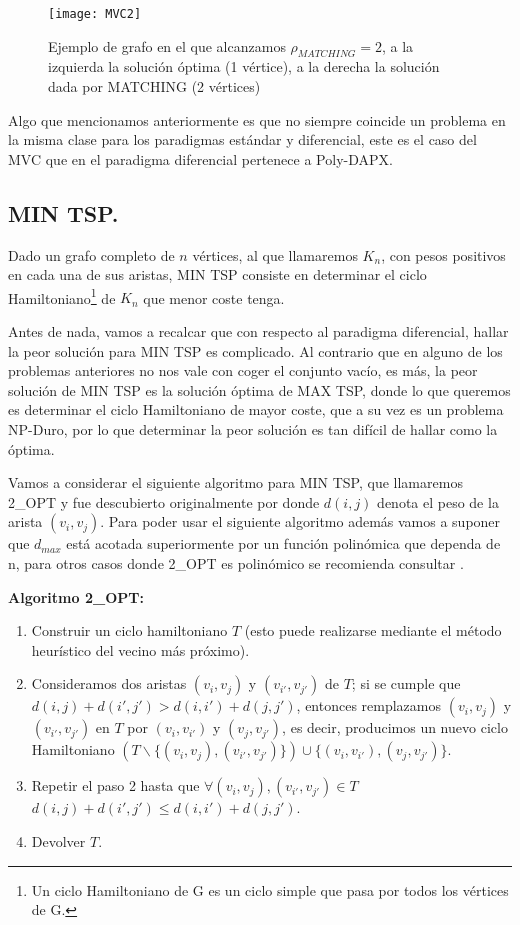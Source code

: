 \documentclass[a4paper,12pt,titlepage]{article}
\begin{document}
\begin{figure}[h]
\centering
\texttt{[image: MVC2]}
\caption{Ejemplo de grafo en el que alcanzamos $\rho_{MATCHING} = 2$, a la izquierda la soluci\'on \'optima (1 v\'ertice), a la derecha la soluci\'on dada por MATCHING (2 v\'ertices)}
\end{figure}

Algo que mencionamos anteriormente es que no siempre coincide un problema en la misma clase para los paradigmas est\'andar y diferencial, este es el caso del MVC que en el paradigma diferencial pertenece a Poly-DAPX\cite{mvc1}.

\subsection{MIN TSP.}
\label{sec:TSP}

Dado un grafo completo de $n$ v\'ertices, al que llamaremos $K_n$, con pesos positivos en cada una de sus aristas, MIN TSP consiste en determinar el ciclo Hamiltoniano\footnote{Un ciclo Hamiltoniano de G es un ciclo simple que pasa por todos los v\'ertices de G.} de $K_n$ que menor coste tenga.

Antes de nada, vamos a recalcar que con respecto al paradigma diferencial, hallar la peor soluci\'on para MIN TSP es complicado. Al contrario que en alguno de los problemas anteriores no nos vale con coger el conjunto vac\'io, es m\'as, la peor soluci\'on de MIN TSP es la soluci\'on \'optima de MAX TSP, donde lo que queremos es determinar el ciclo Hamiltoniano de mayor coste, que a su vez es un problema NP-Duro, por lo que determinar la peor soluci\'on es tan dif\'icil de hallar como la \'optima.

Vamos a considerar el siguiente algoritmo para MIN TSP, que llamaremos 2\_{OPT} y fue descubierto originalmente por \cite{TSP1} donde $d(i,j)$ denota el peso de la arista $(v_i,v_j)$.
Para poder usar el siguiente algoritmo adem\'as vamos a suponer que $d_{max}$ est\'a acotada superiormente por un funci\'on polin\'omica que dependa de n, para otros casos donde 2\_{OPT} es polin\'omico se recomienda consultar \cite{TSP2}.

\vspace{0.3cm}

\textbf{Algoritmo 2\_OPT:}

\begin{enumerate}
\item Construir un ciclo hamiltoniano $T$ (esto puede realizarse mediante el m\'etodo heur\'istico del vecino m\'as pr\'oximo).
\item Consideramos dos aristas $(v_i,v_j)$ y $(v_{i'},v_{j'})$ de $T$; si se cumple que $d(i,j)+d(i',j') > d(i,i')+d(j,j')$, entonces remplazamos $(v_i,v_j)$ y $(v_{i'},v_{j'})$ en $T$ por $(v_i,v_{i'})$ y $(v_j,v_{j'})$, es decir, producimos un nuevo ciclo Hamiltoniano $(T\backslash\{(v_i,v_j),(v_{i'},v_{j'})\})\cup \{(v_i,v_{i'}),(v_j,v_{j'})\}$.
\item Repetir el paso 2 hasta que $\forall (v_i,v_j), (v_{i'},v_{j'}) \in T$ $d(i,j)+d(i',j') \leq d(i,i')+d(j,j')$.
\item Devolver $T$.
\end{enumerate}
\end{document}
